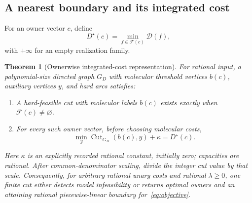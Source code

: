 \documentclass[10pt,letterpaper]{article}
\newtheorem{theorem}{Theorem}
\newcommand{\D}{\mathcal D}
\begin{document}
\subsection{A nearest boundary and its integrated cost}
For an owner vector $c$, define
\[
 D^\star(c)=\min_{f\in\mathcal F(c)}\D(f),
\]
with $+\infty$ for an empty realization family.
\begin{theorem}[Ownerwise integrated-cost representation]\label{thm:cut}
For rational input, a polynomial-size directed graph $G_D$ with molecular threshold vertices $b(c)$, auxiliary vertices $y$, and hard arcs satisfies:
\begin{enumerate}
\item A hard-feasible cut with molecular labels $b(c)$ exists exactly when $\mathcal F(c)\ne\varnothing$.
\item For \emph{every} such owner vector, before choosing molecular costs,
\begin{equation}
 \min_y\operatorname{Cut}_{G_D}(b(c),y)+\kappa=D^\star(c).\label{eq:ownerwise}
\end{equation}
\end{enumerate}
Here $\kappa$ is an explicitly recorded rational constant, initially zero; capacities are rational. After common-denominator scaling, divide the integer cut value by that scale. Consequently, for arbitrary rational unary costs and rational $\lambda\ge0$, one finite cut either detects model infeasibility or returns optimal owners and an attaining rational piecewise-linear boundary for~\eqref{eq:objective}.
\end{theorem}
\end{document}
